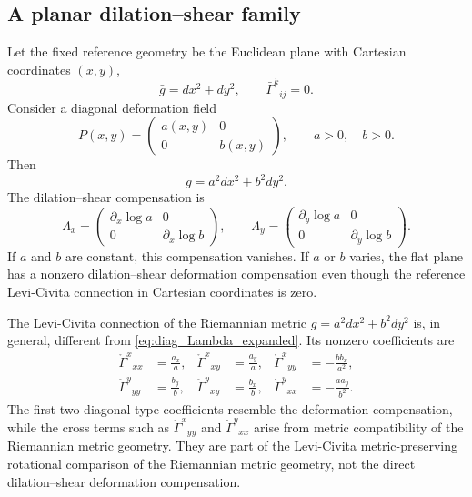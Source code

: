 \documentclass[12pt]{amsart}
\theoremstyle{definition}
\theoremstyle{remark}
\newcommand{\oconn}{\mathring{\Gamma}}
\begin{document}
\subsection{A planar dilation--shear family}

Let the fixed reference geometry be the Euclidean plane with Cartesian coordinates $(x,y)$,
\begin{equation}
 \bar g=dx^2+dy^2,
 \qquad \bar{\Gamma}^k{}_{ij}=0 .
\end{equation}
Consider a diagonal deformation field
\begin{equation}\label{eq:diag_P_expanded}
 P(x,y)=\begin{pmatrix} a(x,y)&0\\0&b(x,y)\end{pmatrix},
 \qquad a>0,\quad b>0 .
\end{equation}
Then
\begin{equation}
 g=a^2dx^2+b^2dy^2 .
\end{equation}
The dilation--shear compensation is
\begin{equation}\label{eq:diag_Lambda_expanded}
 \Lambda_x=\begin{pmatrix} \partial_x\log a&0\\0&\partial_x\log b\end{pmatrix},
 \qquad
 \Lambda_y=\begin{pmatrix} \partial_y\log a&0\\0&\partial_y\log b\end{pmatrix} .
\end{equation}
If $a$ and $b$ are constant, this compensation vanishes.  If $a$ or $b$ varies, the flat plane has a nonzero dilation--shear deformation compensation even though the reference Levi-Civita connection in Cartesian coordinates is zero.

The Levi-Civita connection of the Riemannian metric $g=a^2dx^2+b^2dy^2$ is, in general, different from \eqref{eq:diag_Lambda_expanded}.  Its nonzero coefficients are
\begin{align}
 \oconn^x{}_{xx}&=\frac{a_x}{a},
 &\oconn^x{}_{xy}&=\frac{a_y}{a},
 &\oconn^x{}_{yy}&=-\frac{b b_x}{a^2},\\
 \oconn^y{}_{yy}&=\frac{b_y}{b},
 &\oconn^y{}_{xy}&=\frac{b_x}{b},
 &\oconn^y{}_{xx}&=-\frac{a a_y}{b^2}.
\end{align}
The first two diagonal-type coefficients resemble the deformation compensation, while the cross terms such as $\oconn^x{}_{yy}$ and $\oconn^y{}_{xx}$ arise from metric compatibility of the Riemannian metric geometry.  They are part of the Levi-Civita metric-preserving rotational comparison of the Riemannian metric geometry, not the direct dilation--shear deformation compensation.
\end{document}
